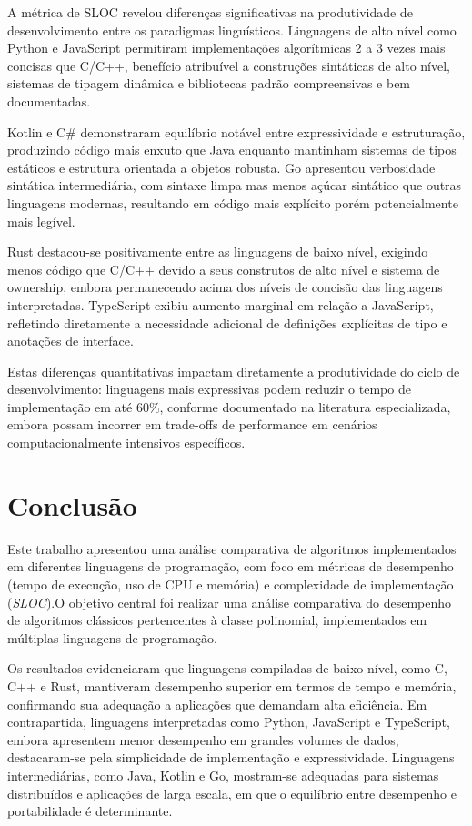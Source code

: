 \documentclass[12pt,a4paper]{article}
\newcommand{\eng}[1]{\textit{#1}}
\begin{document}
A métrica de SLOC revelou diferenças significativas na produtividade de desenvolvimento entre os paradigmas linguísticos. Linguagens de alto nível como Python e JavaScript permitiram implementações algorítmicas 2 a 3 vezes mais concisas que C/C++, benefício atribuível a construções sintáticas de alto nível, sistemas de tipagem dinâmica e bibliotecas padrão compreensivas e bem documentadas.

Kotlin e C\# demonstraram equilíbrio notável entre expressividade e estruturação, produzindo código mais enxuto que Java enquanto mantinham sistemas de tipos estáticos e estrutura orientada a objetos robusta. Go apresentou verbosidade sintática intermediária, com sintaxe limpa mas menos açúcar sintático que outras linguagens modernas, resultando em código mais explícito porém potencialmente mais legível.

Rust destacou-se positivamente entre as linguagens de baixo nível, exigindo menos código que C/C++ devido a seus construtos de alto nível e sistema de ownership, embora permanecendo acima dos níveis de concisão das linguagens interpretadas. TypeScript exibiu aumento marginal em relação a JavaScript, refletindo diretamente a necessidade adicional de definições explícitas de tipo e anotações de interface.

Estas diferenças quantitativas impactam diretamente a produtividade do ciclo de desenvolvimento: linguagens mais expressivas podem reduzir o tempo de implementação em até 60\%, conforme documentado na literatura especializada, embora possam incorrer em trade-offs de performance em cenários computacionalmente intensivos específicos.

\section{Conclusão}
Este trabalho apresentou uma análise comparativa de algoritmos implementados em diferentes linguagens de programação, com foco em métricas de desempenho (tempo de execução, uso de CPU e memória) e complexidade de implementação (\eng{SLOC}).O objetivo central foi realizar uma análise comparativa do desempenho de algoritmos clássicos pertencentes à classe polinomial, implementados em múltiplas linguagens de programação.

Os resultados evidenciaram que linguagens compiladas de baixo nível, como C, C++ e Rust, mantiveram desempenho superior em termos de tempo e memória, confirmando sua adequação a aplicações que demandam alta eficiência. Em contrapartida, linguagens interpretadas como Python, JavaScript e TypeScript, embora apresentem menor desempenho em grandes volumes de dados, destacaram-se pela simplicidade de implementação e expressividade. Linguagens intermediárias, como Java, Kotlin e Go, mostram-se adequadas para sistemas distribuídos e aplicações de larga escala, em que o equilíbrio entre desempenho e portabilidade é determinante.
\end{document}
